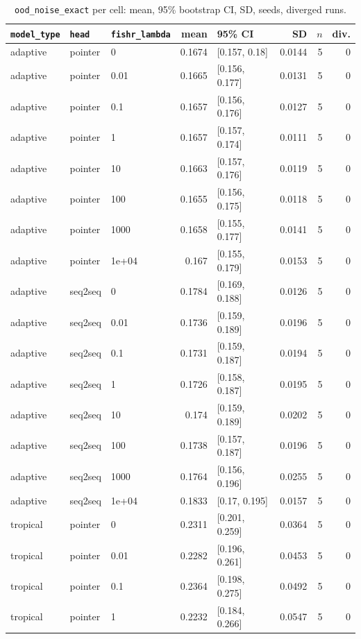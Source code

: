 \documentclass[10pt]{article}
\begin{document}
{\small
\begin{longtable}{lllrlrrr}
\caption{\texttt{ood\_noise\_exact} per cell: mean, 95\% bootstrap CI, SD, seeds, diverged runs.}\label{tab:summary-ood_noise_exact}\\
\toprule
\texttt{model\_type} & \texttt{head} & \texttt{fishr\_lambda} & mean & 95\% CI & SD & $n$ & div.\\
\midrule
\endhead
adaptive & pointer & 0 & 0.1674 & [0.157, 0.18] & 0.0144 & 5 & 0\\
adaptive & pointer & 0.01 & 0.1665 & [0.156, 0.177] & 0.0131 & 5 & 0\\
adaptive & pointer & 0.1 & 0.1657 & [0.156, 0.176] & 0.0127 & 5 & 0\\
adaptive & pointer & 1 & 0.1657 & [0.157, 0.174] & 0.0111 & 5 & 0\\
adaptive & pointer & 10 & 0.1663 & [0.157, 0.176] & 0.0119 & 5 & 0\\
adaptive & pointer & 100 & 0.1655 & [0.156, 0.175] & 0.0118 & 5 & 0\\
adaptive & pointer & 1000 & 0.1658 & [0.155, 0.177] & 0.0141 & 5 & 0\\
adaptive & pointer & 1e+04 & 0.167 & [0.155, 0.179] & 0.0153 & 5 & 0\\
adaptive & seq2seq & 0 & 0.1784 & [0.169, 0.188] & 0.0126 & 5 & 0\\
adaptive & seq2seq & 0.01 & 0.1736 & [0.159, 0.189] & 0.0196 & 5 & 0\\
adaptive & seq2seq & 0.1 & 0.1731 & [0.159, 0.187] & 0.0194 & 5 & 0\\
adaptive & seq2seq & 1 & 0.1726 & [0.158, 0.187] & 0.0195 & 5 & 0\\
adaptive & seq2seq & 10 & 0.174 & [0.159, 0.189] & 0.0202 & 5 & 0\\
adaptive & seq2seq & 100 & 0.1738 & [0.157, 0.187] & 0.0196 & 5 & 0\\
adaptive & seq2seq & 1000 & 0.1764 & [0.156, 0.196] & 0.0255 & 5 & 0\\
adaptive & seq2seq & 1e+04 & 0.1833 & [0.17, 0.195] & 0.0157 & 5 & 0\\
tropical & pointer & 0 & 0.2311 & [0.201, 0.259] & 0.0364 & 5 & 0\\
tropical & pointer & 0.01 & 0.2282 & [0.196, 0.261] & 0.0453 & 5 & 0\\
tropical & pointer & 0.1 & 0.2364 & [0.198, 0.275] & 0.0492 & 5 & 0\\
tropical & pointer & 1 & 0.2232 & [0.184, 0.266] & 0.0547 & 5 & 0\\

\end{longtable}}
\end{document}
